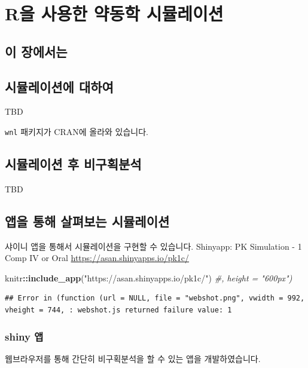 \documentclass[12pt,]{krantz}
\newenvironment{Shaded}{\begin{snugshade}}{\end{snugshade}}
\newcommand{\KeywordTok}[1]{\textcolor[rgb]{0.13,0.29,0.53}{\textbf{#1}}}
\newcommand{\StringTok}[1]{\textcolor[rgb]{0.31,0.60,0.02}{#1}}
\newcommand{\CommentTok}[1]{\textcolor[rgb]{0.56,0.35,0.01}{\textit{#1}}}
\newcommand{\OperatorTok}[1]{\textcolor[rgb]{0.81,0.36,0.00}{\textbf{#1}}}
\newcommand{\NormalTok}[1]{#1}
\theoremstyle{definition}
\theoremstyle{definition}
\theoremstyle{definition}
\theoremstyle{remark}
\begin{document}
\chapter{R을 사용한 약동학 시뮬레이션}\label{simulation}

\section{이 장에서는}\label{summary-simulation}

\section{시뮬레이션에 대하여}\label{-}

TBD

\texttt{wnl} 패키지가 CRAN에 올라와 있습니다.

\section{시뮬레이션 후 비구획분석}\label{--}

TBD

\section{앱을 통해 살펴보는 시뮬레이션}\label{---}

샤이니 앱을 통해서 시뮬레이션을 구현할 수 있습니다. Shinyapp: PK
Simulation - 1 Comp IV or Oral \url{https://asan.shinyapps.io/pk1c/}

\begin{Shaded}
\begin{Highlighting}[]
\NormalTok{knitr}\OperatorTok{::}\KeywordTok{include_app}\NormalTok{(}\StringTok{"https://asan.shinyapps.io/pk1c/"}\NormalTok{) }\CommentTok{#, height = "600px")}
\end{Highlighting}
\end{Shaded}

\begin{verbatim}
## Error in (function (url = NULL, file = "webshot.png", vwidth = 992, vheight = 744, : webshot.js returned failure value: 1
\end{verbatim}

\subsection{shiny 앱}\label{shiny-}

웹브라우저를 통해 간단히 비구획분석을 할 수 있는 앱을 개발하였습니다.
\end{document}
